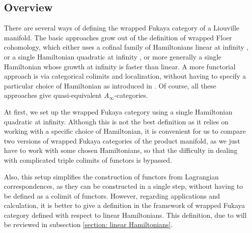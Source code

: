 \documentclass{amsart}
\numberwithin{equation}{section}
\numberwithin{figure}{section}
\begin{document}
\subsection{Overview}
	There are several ways of defining the wrapped Fukaya category of a Liouville manifold. The basic approaches grow out of the definition of wrapped Floer cohomology, which either uses a cofinal family of Hamiltonians linear at infinity \cite{Abouzaid-Seidel}, or a single Hamiltonian quadratic at infinity \cite{Abouzaid1}, or more generally a single Hamiltonian whose growth at infinity is faster than linear. A more functorial approach is via categorical colimits and localization, without having to specify a particular choice of Hamiltonian as introduced in \cite{Ganatra-Pardon-Shende}. Of course, all these approaches give quasi-equivalent $A_{\infty}$-categories. \par
	At first, we set up the wrapped Fukaya category using a single Hamiltonian quadratic at infinity. Although this is not the best definition as it relies on working with a specific choice of Hamiltonian, it is convenient for us to compare two versions of wrapped Fukaya categories of the product manifold, as we just have to work with some chosen Hamiltonians, so that the difficulty in dealing with complicated triple colimits of functors is bypassed. \par
	Also, this setup simplifies the construction of functors from Lagrangian correspondences, as they can be constructed in a single step, without having to be defined as a colimit of functors. However, regarding applications and calculation, it is better to give a definition in the framework of wrapped Fukaya category defined with respect to linear Hamiltonians. This definition, due to \cite{Abouzaid-Seidel} will be reviewed in subsection \ref{section: linear Hamiltonians}. \par
\end{document}
